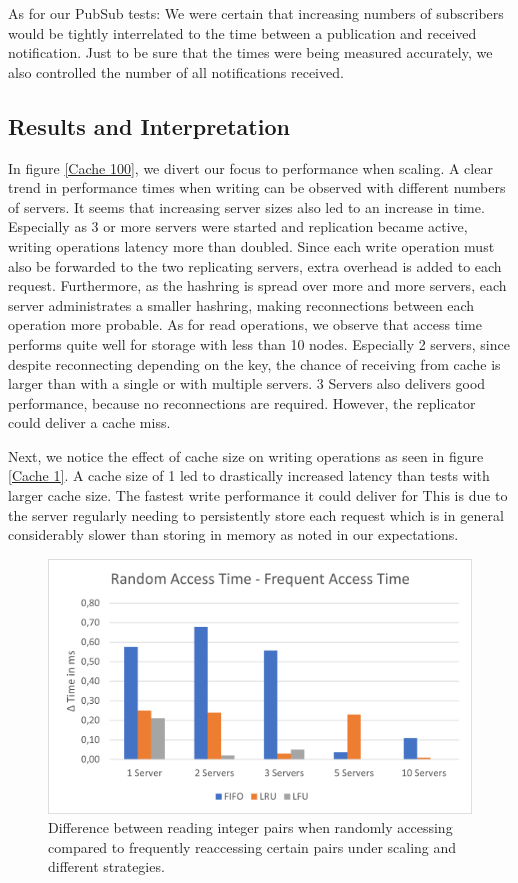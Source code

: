 \documentclass[sigconf]{acmart}
\begin{document}
As for our PubSub tests: We were certain that increasing numbers of subscribers would be tightly interrelated to the time between a publication and received notification. Just to be sure that the times were being measured accurately, we also controlled the number of all notifications received.

\subsection{Results and Interpretation}
In figure \ref{Cache 100}, we divert our focus to performance when scaling. A clear trend in performance times when writing can be observed with different numbers of servers. 
It seems that increasing server sizes also led to an increase in time. 
Especially as 3 or more servers were started and replication became active, writing operations latency more than doubled. Since each write operation must also be forwarded to the two replicating servers, extra overhead is added to each request. Furthermore, as the hashring is spread over more and more servers, each server administrates a smaller hashring, making reconnections between each operation more probable. 
As for read operations, we observe that access time performs quite well for storage with less than 10 nodes. Especially 2 servers, since despite reconnecting depending on the key, the chance of receiving from cache is larger than with a single or with multiple servers. 3 Servers also delivers good performance, because no reconnections are required. However, the replicator could deliver a cache miss.

Next, we notice the effect of cache size on writing operations as seen in figure \ref{Cache 1}. A cache size of 1 led to drastically increased latency than tests with larger cache size. The fastest write performance it could deliver for This is due to the server regularly needing to persistently store each request which is in general considerably slower than storing in memory as noted in our expectations.

\begin{center}
  \begin{figure}[htbp]
    \centerline{\includegraphics[scale=0.6]{attachments/FrequentAccess.png}}
    \caption{Difference between reading integer pairs when randomly accessing compared to frequently reaccessing certain pairs under scaling and different strategies.}
    \label{FrequentAccess}
  \end{figure}
\end{center}
\end{document}
